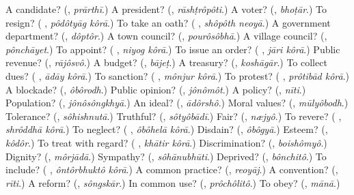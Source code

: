 \begin{tcolorbox}[breakable,colback=teal!4,colframe=teal!35!black,title={Before you move on}]
A candidate? (\textbf{}, \emph{prārthī}.) A president? (\textbf{}, \emph{rāshṭrôpôti}.) A voter? (\textbf{}, \emph{bhoṭār}.) To resign? (\textbf{ }, \emph{pôdôtyāg kôrā}.) To take an oath? (\textbf{ }, \emph{shôpôth neoyā}.) A government department? (\textbf{}, \emph{dôptôr}.) A town council? (\textbf{}, \emph{pourôsôbhā}.) A village council? (\textbf{}, \emph{pônchāyet}.) To appoint? (\textbf{ }, \emph{niyog kôrā}.) To issue an order? (\textbf{ }, \emph{jāri kôrā}.) Public revenue? (\textbf{}, \emph{rājôsvô}.) A budget? (\textbf{}, \emph{bājeṭ}.) A treasury? (\textbf{}, \emph{koshāgār}.) To collect dues? (\textbf{ }, \emph{ādāy kôrā}.) To sanction? (\textbf{ }, \emph{mônjur kôrā}.) To protest? (\textbf{ }, \emph{prôtibād kôrā}.) A blockade? (\textbf{}, \emph{ôbôrodh}.) Public opinion? (\textbf{}, \emph{jônômôt}.) A policy? (\textbf{}, \emph{nīti}.) Population? (\textbf{}, \emph{jônôsôngkhyā}.) An ideal? (\textbf{}, \emph{ādôrshô}.) Moral values? (\textbf{}, \emph{mūlyôbodh}.) Tolerance? (\textbf{}, \emph{sôhishnutā}.) Truthful? (\textbf{}, \emph{sôtyôbādī}.) Fair? (\textbf{}, \emph{næjyô}.) To revere? (\textbf{ }, \emph{shrôddhā kôrā}.) To neglect? (\textbf{ }, \emph{ôbôhelā kôrā}.) Disdain? (\textbf{}, \emph{ôbôgyā}.) Esteem? (\textbf{}, \emph{kôdôr}.) To treat with regard? (\textbf{ }, \emph{khātir kôrā}.) Discrimination? (\textbf{}, \emph{boishômyô}.) Dignity? (\textbf{}, \emph{môrjādā}.) Sympathy? (\textbf{}, \emph{sôhānubhūti}.) Deprived? (\textbf{}, \emph{bônchitô}.) To include? (\textbf{ }, \emph{ôntôrbhuktô kôrā}.) A common practice? (\textbf{}, \emph{reoyāj}.) A convention? (\textbf{}, \emph{rīti}.) A reform? (\textbf{}, \emph{sôngskār}.) In common use? (\textbf{}, \emph{prôchôlitô}.) To obey? (\textbf{}, \emph{mānā}.)
\end{tcolorbox}

